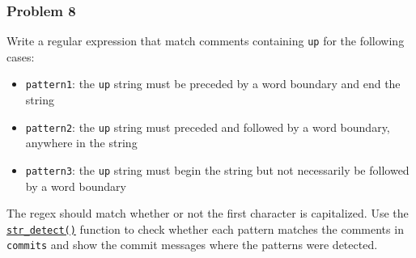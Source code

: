 \documentclass[
]{article}
\newenvironment{Shaded}{\begin{snugshade}}{\end{snugshade}}
\newcommand{\AttributeTok}[1]{\textcolor[rgb]{0.77,0.63,0.00}{#1}}
\newcommand{\FunctionTok}[1]{\textcolor[rgb]{0.00,0.00,0.00}{#1}}
\newcommand{\NormalTok}[1]{#1}
\newcommand{\OtherTok}[1]{\textcolor[rgb]{0.56,0.35,0.01}{#1}}
\newcommand{\SpecialCharTok}[1]{\textcolor[rgb]{0.00,0.00,0.00}{#1}}
\newcommand{\StringTok}[1]{\textcolor[rgb]{0.31,0.60,0.02}{#1}}
\providecommand{\tightlist}{%
  \setlength{\itemsep}{0pt}\setlength{\parskip}{0pt}}
\begin{document}
\hypertarget{problem-8}{%
\subsubsection{Problem 8}\label{problem-8}}

Write a regular expression that match comments containing \texttt{up}
for the following cases:

\begin{itemize}
\tightlist
\item
  \texttt{pattern1}: the \texttt{up} string must be preceded by a word
  boundary and end the string
\item
  \texttt{pattern2}: the \texttt{up} string must preceded and followed
  by a word boundary, anywhere in the string
\item
  \texttt{pattern3}: the \texttt{up} string must begin the string but
  not necessarily be followed by a word boundary
\end{itemize}

The regex should match whether or not the first character is
capitalized. Use the
\href{https://stringr.tidyverse.org/reference/str_detect.html}{\texttt{str\_detect()}}
function to check whether each pattern matches the comments in
\texttt{commits} and show the commit messages where the patterns were
detected.

\begin{Shaded}
\end{Shaded}
\end{document}
